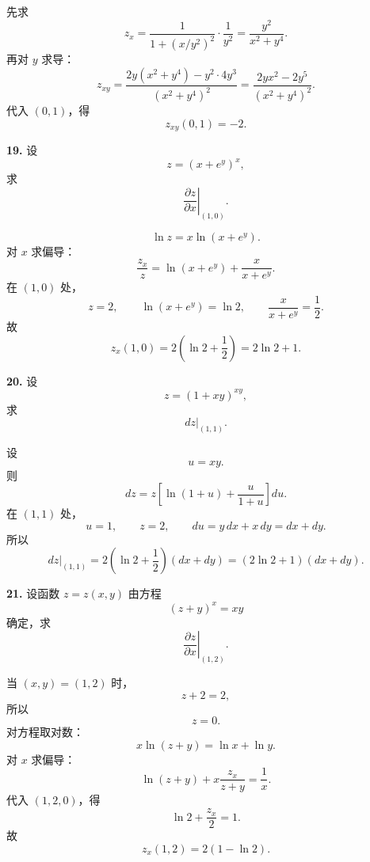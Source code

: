 \begin{solutionblock}
先求
\[
z_x=\frac{1}{1+(x/y^2)^2}\cdot\frac1{y^2}
=\frac{y^2}{x^2+y^4}.
\]
再对 \(y\) 求导：
\[
z_{xy}
=\frac{2y(x^2+y^4)-y^2\cdot4y^3}{(x^2+y^4)^2}
=\frac{2yx^2-2y^5}{(x^2+y^4)^2}.
\]
代入 \((0,1)\)，得
\[
\boxed{z_{xy}(0,1)=-2}.
\]
\end{solutionblock}

\begin{problemblock}
\textbf{19.} 设
\[
z=(x+e^y)^x,
\]
求
\[
\left.\frac{\partial z}{\partial x}\right|_{(1,0)}.
\]
\end{problemblock}

\begin{solutionblock}
\[
\ln z=x\ln(x+e^y).
\]
对 \(x\) 求偏导：
\[
\frac{z_x}{z}=\ln(x+e^y)+\frac{x}{x+e^y}.
\]
在 \((1,0)\) 处，
\[
z=2,\qquad \ln(x+e^y)=\ln2,\qquad \frac{x}{x+e^y}=\frac12.
\]
故
\[
z_x(1,0)=2\left(\ln2+\frac12\right)=\boxed{2\ln2+1}.
\]
\end{solutionblock}

\begin{problemblock}
\textbf{20.} 设
\[
z=(1+xy)^{xy},
\]
求
\[
dz\big|_{(1,1)}.
\]
\end{problemblock}

\begin{solutionblock}
设
\[
u=xy.
\]
则
\[
dz=z\left[\ln(1+u)+\frac{u}{1+u}\right]du.
\]
在 \((1,1)\) 处，
\[
u=1,\qquad z=2,\qquad du=y\,dx+x\,dy=dx+dy.
\]
所以
\[
dz\big|_{(1,1)}
=2\left(\ln2+\frac12\right)(dx+dy)
=\boxed{(2\ln2+1)(dx+dy)}.
\]
\end{solutionblock}

\begin{problemblock}
\textbf{21.} 设函数 \(z=z(x,y)\) 由方程
\[
(z+y)^x=xy
\]
确定，求
\[
\left.\frac{\partial z}{\partial x}\right|_{(1,2)}.
\]
\end{problemblock}

\begin{solutionblock}
当 \((x,y)=(1,2)\) 时，
\[
z+2=2,
\]
所以
\[
z=0.
\]
对方程取对数：
\[
x\ln(z+y)=\ln x+\ln y.
\]
对 \(x\) 求偏导：
\[
\ln(z+y)+x\frac{z_x}{z+y}=\frac1x.
\]
代入 \((1,2,0)\)，得
\[
\ln2+\frac{z_x}{2}=1.
\]
故
\[
\boxed{z_x(1,2)=2(1-\ln2)}.
\]
\end{solutionblock}

